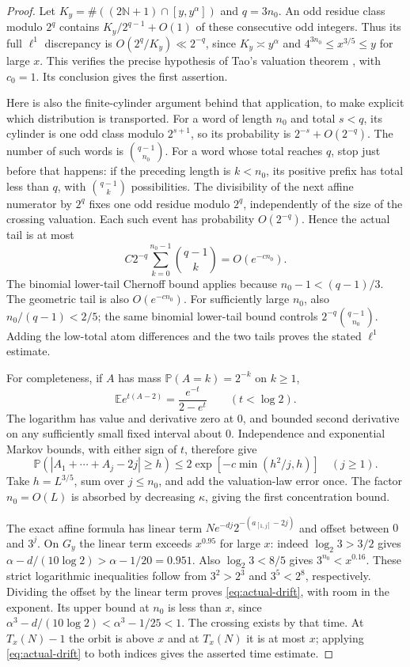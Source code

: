 \documentclass[11pt]{article}
\theoremstyle{remark}\newtheorem{remark}[proposition]{Remark}
\newcommand{\PP}{\mathbb P}
\newcommand{\EE}{\mathbb E}
\newcommand{\NN}{\mathbb N}
\begin{document}
\begin{proof}
Let $K_y=\#((2\NN+1)\cap[y,y^\alpha])$ and $q=3n_0$.
An odd residue class modulo $2^q$ contains $K_y/2^{q-1}+O(1)$
of these consecutive odd integers. Thus its full $\ell^1$ discrepancy
is $O(2^q/K_y)\ll2^{-q}$, since $K_y\asymp y^\alpha$ and
$4^{3n_0}\le x^{3/5}\le y$ for large $x$. This verifies the precise
hypothesis of Tao's valuation theorem \cite[Proposition~1.9]{Tao7},
with $c_0=1$. Its conclusion gives the first assertion.

Here is also the finite-cylinder argument behind that application, to
make explicit which distribution is transported. For a word of length
$n_0$ and total $s<q$, its cylinder is one odd class modulo $2^{s+1}$,
so its probability is $2^{-s}+O(2^{-q})$. The number of such words
is $\binom{q-1}{n_0}$. For a word whose total reaches $q$, stop just
before that happens: if the preceding length is $k<n_0$, its positive
prefix has total less than $q$, with $\binom{q-1}{k}$ possibilities.
The divisibility of the next affine numerator by $2^q$ fixes one odd
residue modulo $2^q$, independently of the size of the crossing
valuation. Each such event has probability $O(2^{-q})$. Hence the
actual tail is at most
\[
 C2^{-q}\sum_{k=0}^{n_0-1}\binom{q-1}{k}=O(e^{-c n_0}).
\]
The binomial lower-tail Chernoff bound applies because
$n_0-1<(q-1)/3$. The geometric tail is also $O(e^{-c n_0})$.
For sufficiently large $n_0$, also $n_0/(q-1)<2/5$; the same
binomial lower-tail bound controls $2^{-q}\binom{q-1}{n_0}$.
Adding the low-total atom differences
and the two tails proves the stated $\ell^1$ estimate.

For completeness, if $A$ has mass $\PP(A=k)=2^{-k}$ on $k\ge1$,
\[
 \EE e^{t(A-2)}=\frac{e^{-t}}{2-e^t}\qquad(t<\log2).
\]
The logarithm has value and derivative zero at $0$, and bounded
second derivative on any sufficiently small fixed interval about
$0$. Independence and exponential Markov bounds, with either sign
of $t$, therefore give
\[
 \PP(|A_1+\cdots+A_j-2j|\ge h)
 \le2\exp[-c\min(h^2/j,h)]\quad(j\ge1).
\]
Take $h=L^{3/5}$, sum over $j\le n_0$, and add the valuation-law
error once. The factor $n_0=O(L)$ is absorbed by decreasing
$\kappa$, giving the first concentration bound.

The exact affine formula has linear term
$Ne^{-dj}2^{-(a_{[1,j]}-2j)}$ and offset between $0$ and $3^j$.
On $G_y$ the linear term exceeds $x^{0.95}$ for large $x$:
indeed $\log_2 3>3/2$ gives
$\alpha-d/(10\log2)>\alpha-1/20=0.951$.
Also $\log_2 3<8/5$ gives $3^{n_0}<x^{0.16}$.
These strict logarithmic inequalities follow from $3^2>2^3$
and $3^5<2^8$, respectively. Dividing the offset by the linear term
proves \eqref{eq:actual-drift}, with room in the exponent.
Its upper bound at $n_0$ is less than $x$, since
$\alpha^3-d/(10\log2)<\alpha^3-1/25<1$.
The crossing exists by that time. At $T_x(N)-1$ the orbit is above
$x$ and at $T_x(N)$ it is at most $x$; applying
\eqref{eq:actual-drift} to both indices gives the asserted time estimate.


\end{proof}
\end{document}
